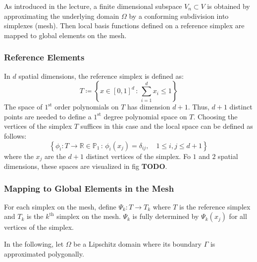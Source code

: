 \documentclass[11pt,a4paper]{article}
\begin{document}
As introduced in the lecture, a finite dimensional subspace $V_n \subset V$ is
obtained by approximating the underlying domain $\Omega$ by a conforming
subdivision into simplexes (mesh). Then local basis functions defined on a
reference simplex are mapped to global elements on the mesh.


\subsubsection{Reference Elements}
In $d$ spatial dimensions, the reference simplex is defined as:
$$T \coloneqq \left\{x \in \left[ 0,1 \right] ^d \, : \, \sum^d_{i=1} x_i \le 1\right\}$$
The space of $1^{\text{st}}$ order polynomials on $T$ has dimension $d+1$.
Thus, $d+1$ distinct points are needed to define a $1^{\text{st}}$ degree
polynomial space on $T$. Choosing the vertices of the simplex $T$ suffices in
this case and the local space can be defined as follows:
$$
\left\{ \phi_i: T \to \mathbb{R} \in \mathbb{P}_1 \, : \, \phi_i(x_j) = \delta_{ij},\quad 1 \le i,j \le d+1\right\}
$$
where the $x_j$ are the $d+1$ distinct vertices of the simplex. Fo $1$ and $2$
spatial dimensions, these spaces are visualized in fig {\bf TODO}.

\subsubsection*{Mapping to Global Elements in the Mesh}
For each simplex on the mesh, define $\Psi_k: T \to T_k$ where $T$ is the
reference simplex and $T_k$ is the $k^\text{th}$ simplex on the mesh.
$\Psi_k$ is fully determined by $\Psi_k(x_j)$ for all vertices of the simplex.

In the following, let $\Omega$ be a Lipschitz domain where its boundary
$\Gamma$ is approximated polygonally.
\end{document}
